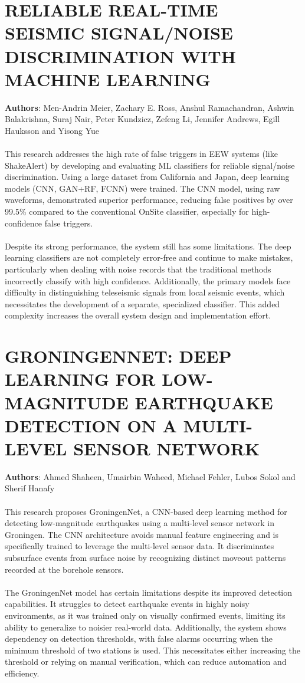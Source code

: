 \documentclass[a4paper,12pt]{report}
\begin{document}
\section{RELIABLE REAL-TIME SEISMIC SIGNAL/NOISE DISCRIMINATION WITH MACHINE LEARNING }
\label{sec:2.8}
\textbf{Authors}: Men-Andrin Meier, Zachary E. Ross, Anshul Ramachandran, Ashwin Balakrishna, Suraj Nair, Peter Kundzicz, Zefeng Li, Jennifer Andrews, Egill Hauksson and Yisong Yue\\
\\
This research addresses the high rate of false triggers in EEW systems (like ShakeAlert) by developing and evaluating ML classifiers for reliable signal/noise discrimination. Using a large dataset from California and Japan, deep learning models (CNN, GAN+RF, FCNN) were trained. The CNN model, using raw waveforms, demonstrated superior performance, reducing false positives by over 99.5\% compared to the conventional OnSite classifier, especially for high-confidence false triggers.
\\
\\
Despite its strong performance, the system still has some limitations. The deep learning classifiers are not completely error-free and continue to make mistakes, particularly when dealing with noise records that the traditional methods incorrectly classify with high confidence. Additionally, the primary models face difficulty in distinguishing teleseismic signals from local seismic events, which necessitates the development of a separate, specialized classifier. This added complexity increases the overall system design and implementation effort.

\section{GRONINGENNET: DEEP LEARNING FOR LOW-MAGNITUDE EARTHQUAKE DETECTION ON A MULTI-LEVEL SENSOR NETWORK}
\label{sec:2.9}
\textbf{Authors}: Ahmed Shaheen, Umairbin Waheed, Michael Fehler, Lubos Sokol and Sherif Hanafy\\
\\
This research proposes GroningenNet, a CNN-based deep learning method for detecting low-magnitude earthquakes using a multi-level sensor network in Groningen. The CNN architecture avoids manual feature engineering and is specifically trained to leverage the multi-level sensor data. It discriminates subsurface events from surface noise by recognizing distinct moveout patterns recorded at the borehole sensors.
\\
\\
The GroningenNet model has certain limitations despite its improved detection capabilities. It struggles to detect earthquake events in highly noisy environments, as it was trained only on visually confirmed events, limiting its ability to generalize to noisier real-world data. Additionally, the system shows dependency on detection thresholds, with false alarms occurring when the minimum threshold of two stations is used. This necessitates either increasing the threshold or relying on manual verification, which can reduce automation and efficiency.
\end{document}
